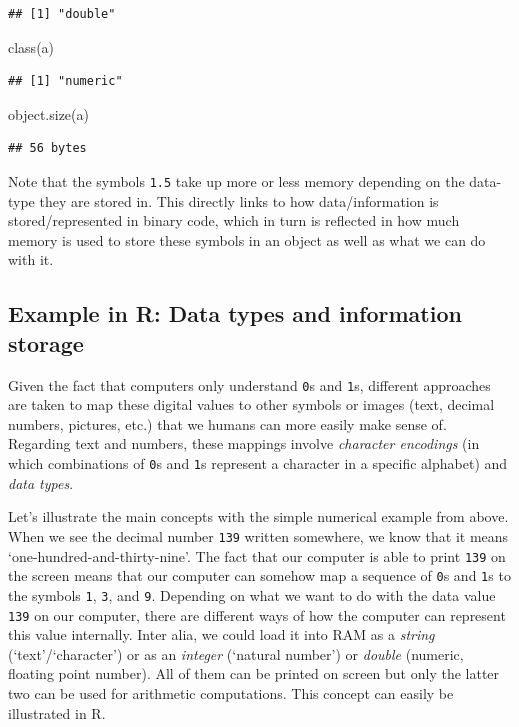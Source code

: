 \documentclass[
  12pt,
]{style/krantz}
\newenvironment{Shaded}{\begin{snugshade}}{\end{snugshade}}
\newcommand{\FunctionTok}[1]{\textcolor[rgb]{0.00,0.00,0.00}{#1}}
\newcommand{\NormalTok}[1]{#1}
\begin{document}
\begin{verbatim}
## [1] "double"
\end{verbatim}

\begin{Shaded}
\begin{Highlighting}[]
\FunctionTok{class}\NormalTok{(a)}
\end{Highlighting}
\end{Shaded}

\begin{verbatim}
## [1] "numeric"
\end{verbatim}

\begin{Shaded}
\begin{Highlighting}[]
\FunctionTok{object.size}\NormalTok{(a)}
\end{Highlighting}
\end{Shaded}

\begin{verbatim}
## 56 bytes
\end{verbatim}

Note that the symbols \texttt{1.5} take up more or less memory depending on the data-type they are stored in. This directly links to how data/information is stored/represented in binary code, which in turn is reflected in how much memory is used to store these symbols in an object as well as what we can do with it.

\hypertarget{example-in-r-data-types-and-information-storage}{%
\subsection{Example in R: Data types and information storage}\label{example-in-r-data-types-and-information-storage}}

Given the fact that computers only understand \texttt{0}s and \texttt{1}s, different approaches are taken to map these digital values to other symbols or images (text, decimal numbers, pictures, etc.) that we humans can more easily make sense of. Regarding text and numbers, these mappings involve \emph{character encodings} (in which combinations of \texttt{0}s and \texttt{1}s represent a character in a specific alphabet) and \emph{data types}.

Let's illustrate the main concepts with the simple numerical example from above. When we see the decimal number \texttt{139} written somewhere, we know that it means `one-hundred-and-thirty-nine'. The fact that our computer is able to print \texttt{139} on the screen means that our computer can somehow map a sequence of \texttt{0}s and \texttt{1}s to the symbols \texttt{1}, \texttt{3}, and \texttt{9}. Depending on what we want to do with the data value \texttt{139} on our computer, there are different ways of how the computer can represent this value internally. Inter alia, we could load it into RAM as a \emph{string} (`text'/`character') or as an \emph{integer} (`natural number') or \emph{double} (numeric, floating point number). All of them can be printed on screen but only the latter two can be used for arithmetic computations. This concept can easily be illustrated in R.
\end{document}
